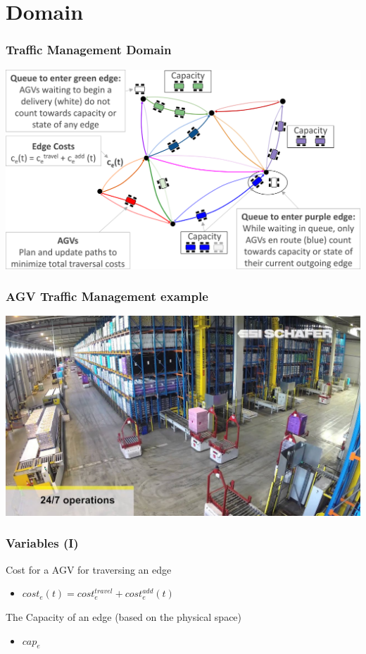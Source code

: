 \documentclass{beamer}
\begin{document}
	\section{Domain}
	\begin{frame}
		\frametitle{Traffic Management Domain}
		\includegraphics[width=\textwidth]{enviroment.png}
	\end{frame}
	\begin{frame}
		\frametitle{AGV Traffic Management example}
		\includegraphics[width=\textwidth]{warehouse.jpg}
	\end{frame}
	\begin{frame}
		\frametitle{Variables (I)}
		Cost for a AGV for traversing an edge
		\begin{itemize}
			\item $cost_e(t) = cost_e^{travel} + cost_e^{add}(t)$
		\end{itemize}
		The Capacity of an edge (based on the physical space)
		\begin{itemize}
			\item $cap_e$
		\end{itemize}
	\end{frame}
\end{document}
